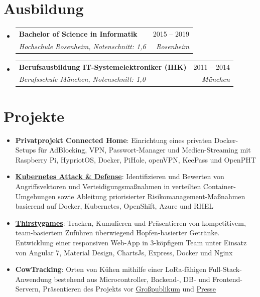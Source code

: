 \documentclass[letterpaper,11pt]{article}
\makeatletter
\newcommand{\resumeSubheading}[4]{
  \vspace{-1pt}\item
    \begin{tabular*}{0.97\textwidth}[t]{l@{\extracolsep{\fill}}r}
      \textbf{#1} & #2 \\
      \textit{\small#3} & \textit{\small #4} \\
    \end{tabular*}\vspace{-5pt}
}
\newcommand{\resumeSubHeadingListStart}{\begin{itemize}[leftmargin=*]}
\newcommand{\resumeSubHeadingListEnd}{\end{itemize}}
\newcommand{\resumeItemListEnd}{\end{itemize}\vspace{-5pt}}
\makeatother
\begin{document}
\section{Ausbildung}
  \resumeSubHeadingListStart
    \resumeSubheading
   	  {Bachelor of Science in Informatik}{2015 -- 2019}    
      {Hochschule Rosenheim,  Notenschnitt: 1,6}{Rosenheim}
    \resumeSubheading
      {Berufsausbildung IT-Systemelektroniker (IHK)}{2011 -- 2014}
      {Berufsschule München,  Notenschnitt: 1,0}{München}
  \resumeSubHeadingListEnd

\newpage

\section{Projekte}
\resumeSubHeadingListStart

\item{
	\textbf{Privatprojekt Connected Home}{: 	\linebreak 
		Einrichtung eines privaten Docker-Setups für AdBlocking, VPN, Passwort-Manager und Medien-Streaming mit Raspberry Pi, HypriotOS, Docker, PiHole, openVPN, KeePass und OpenPHT}
}
\item{
	\textbf{\href{https://github.com/gramsimamsi/bachelorThesis/blob/master/thesis.pdf}{Kubernetes Attack \& Defense}}{: 	\linebreak 
		Identifizieren und Bewerten von Angriffsvektoren und Verteidigungsmaßnahmen in verteilten Container-Umgebungen sowie Ableitung priorisierter Risikomanagement-Maßnahmen basierend auf Docker, Kubernetes, OpenShift, Azure und RHEL}
}
\item{
	\textbf{\href{https://github.com/gramsimamsi/thirstygames}{Thirstygames}}{: 	\linebreak 
		Tracken, Kumulieren und Präsentieren von kompetitivem, team-basiertem \linebreak
		Zuführen überwiegend Hopfen-basierter Getränke. \linebreak 
		Entwicklung einer responsiven Web-App in 3-köpfigem Team unter Einsatz von \linebreak
		Angular 7, Material Design, ChartsJs, Express, Docker und Nginx }
}
\item{
	\textbf{CowTracking}{: 	\linebreak 
		Orten von Kühen mithilfe einer LoRa-fähigen Full-Stack-Anwendung \linebreak
		bestehend aus Microcontroller, Backend-, DB- und Frontend-Servern, \linebreak
		Präsentieren des Projekts vor 
		\href{https://www.youtube.com/watch?v=JIbElz2qEes}{Großpublikum}
		und \href{https://www.rfo.de/mediathek/video/digitalisierungsmesse-an-der-hochschule-rosenheim/}{Presse} }
}
\resumeItemListEnd
\end{document}
